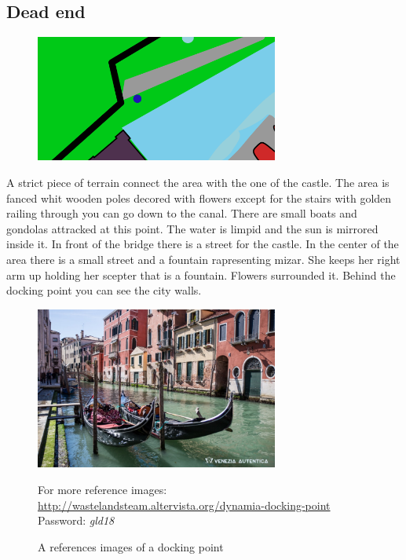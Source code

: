 \subsection{Dead end}
\begin{figure}[H]
    \centering
    \includegraphics[width=8cm]{Images/Maps/dockingPoint}
  \end{figure}
A strict piece of terrain connect the area with the one of the castle. 
The area is fanced whit wooden poles decored with flowers except for the stairs with golden railing through you can go down to the canal.
There are small boats and gondolas attracked at this point. The water is limpid and the sun is mirrored inside it. 
In front of the bridge there is a street for the castle. 
In the center of the area there is a small street and a fountain rapresenting mizar. She keeps her right arm up holding her scepter that is a fountain. Flowers surrounded it. Behind the docking point you can see the city walls.
\begin{figure}[H]
    \centering
    \includegraphics[width=8cm]{Images/Landmarks/dockingPoint}
    \caption{A references images of a docking point}
    For more reference images: \href{http://wastelandsteam.altervista.org/dynamia-docking-point}{http://wastelandsteam.altervista.org/dynamia-docking-point}\\Password: \textit{gld18}
  \end{figure}
